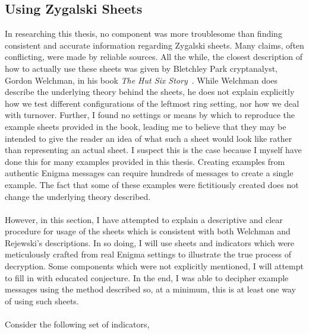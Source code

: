 \subsection{Using Zygalski Sheets}
In researching this thesis, no component was more troublesome than
finding consistent and accurate information regarding Zygalski
sheets. Many claims, often conflicting, were made by reliable
sources. All the while, the closest description of how to actually
use these sheets was given by Bletchley Park cryptanalyst, Gordon
Welchman, in his book \emph{The
Hut Six Story}~\cite{Welchman1982HutSix}. While Welchman does describe the underlying theory
behind the sheets, he does not explain explicitly how we test
different configurations of the leftmost ring setting, nor how we
deal with turnover. Further, I found no settings or means by which to
reproduce the example sheets provided in the book, leading me to
believe that they may be intended to give the reader an idea of what
such a sheet would look like rather than representing an actual
sheet. I suspect this is the case because I myself have done this for
many examples provided in this thesis. Creating examples from
authentic Enigma messages can require hundreds of messages to create
a single example. The fact that some of these examples were
fictitiously created does not change the underlying theory described.
\\\\However, in this section, I have attempted to explain a
descriptive and clear procedure for usage of the sheets which is
consistent with both Welchman and Rejewski's descriptions. In so doing, I
will use sheets and indicators which were meticulously crafted from
real Enigma settings to illustrate the true process of decryption.
Some components which were not explicitly mentioned, I will attempt to
fill in with educated conjecture. In the end, I was able to decipher
example messages using the method described so, at a minimum, this is
at least one way of using such sheets.
\\\\Consider the following set of indicators,
